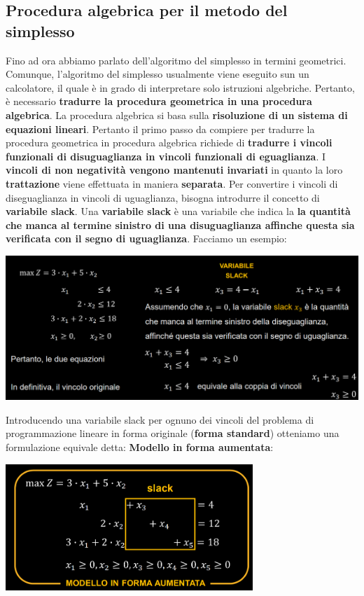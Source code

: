 \documentclass[12pt]{article}
\begin{document}
\subsection{Procedura algebrica per il metodo del simplesso}
Fino ad ora abbiamo parlato dell'algoritmo del simplesso in termini geometrici.
Comunque, l'algoritmo del simplesso usualmente viene eseguito sun un calcolatore, il quale è in grado di interpretare solo istruzioni algebriche.
Pertanto, è necessario \textbf{tradurre la procedura geometrica in una procedura algebrica}.
La procedura algebrica si basa sulla \textbf{risoluzione di un sistema di equazioni lineari}.
Pertanto il primo passo da compiere per tradurre la procedura geometrica in procedura algebrica richiede di \textbf{tradurre i vincoli funzionali di disuguaglianza in vincoli funzionali di eguaglianza}.
I \textbf{vincoli di non negatività vengono mantenuti invariati} in quanto la loro \textbf{trattazione} viene effettuata in maniera \textbf{separata}.
Per convertire i vincoli di diseguaglianza in vincoli di uguaglianza, bisogna introdurre il concetto di \textbf{variabile slack}. \newline
Una \textbf{variabile slack} è una variabile che indica la \textbf{la quantità che manca al termine sinistro di una disuguaglianza affinche questa sia verificata con il segno di uguaglianza}.
Facciamo un esempio:
\begin{center}
    \includegraphics[width = 1\textwidth]{Images/20.PNG}
\end{center}
Introducendo una variabile slack per ognuno dei vincoli del problema di programmazione lineare in forma originale (\textbf{forma standard}) otteniamo una formulazione equivale detta:
\textbf{Modello in forma aumentata}:
\begin{center}
    \includegraphics[width = 0.70\textwidth]{Images/21.PNG}
\end{center}
\end{document}
